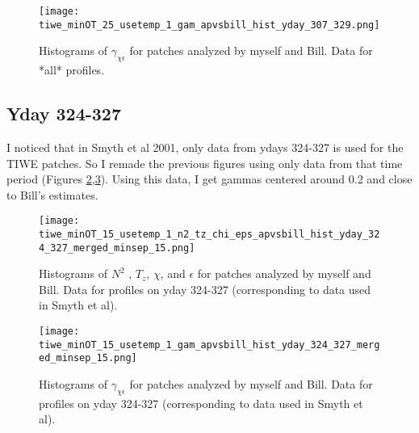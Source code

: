 \documentclass[11pt]{article}
\begin{document}
\begin{figure}[htbp]
\texttt{[image: tiwe\_minOT\_25\_usetemp\_1\_gam\_apvsbill\_hist\_yday\_307\_329.png]}
\caption{Histograms of $\gamma_{\chi\epsilon}$ for patches analyzed by myself and Bill. Data for *all* profiles.}
\label{comp_bill_ap_gam}
\end{figure}



\clearpage
\subsection{Yday 324-327}

I noticed that in Smyth et al 2001, only data from ydays 324-327 is used for the TIWE patches. So I remade the previous figures using only data from that time period (Figures \ref{comp_bill_ap_324_327},\ref{comp_bill_ap_gam_324_327}). Using this data, I get  gammas centered around 0.2 and close to Bill's estimates. 

\begin{figure}[htbp]
\texttt{[image: tiwe\_minOT\_15\_usetemp\_1\_n2\_tz\_chi\_eps\_apvsbill\_hist\_yday\_324\_327\_merged\_minsep\_15.png]}
\caption{Histograms of $N^2$ , $T_z$, $\chi$, and $\epsilon$ for patches analyzed by myself and Bill. Data for profiles on yday 324-327 (corresponding to data used in Smyth et al).}
\label{comp_bill_ap_324_327}
\end{figure}


\begin{figure}[htbp]
\texttt{[image: tiwe\_minOT\_15\_usetemp\_1\_gam\_apvsbill\_hist\_yday\_324\_327\_merged\_minsep\_15.png]}
\caption{Histograms of $\gamma_{\chi\epsilon}$ for patches analyzed by myself and Bill. Data for profiles on yday 324-327 (corresponding to data used in Smyth et al).}
\label{comp_bill_ap_gam_324_327}
\end{figure}





%
%
\end{document}
